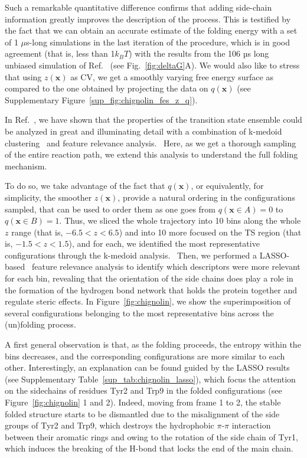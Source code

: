     Such a remarkable quantitative difference confirms that adding side-chain information greatly improves the description of the process.   
    This is testified by the fact that we can obtain an accurate estimate of the folding energy with a set of 1 $\mu$s-long simulations in the last iteration of the procedure, which is in good agreement (that is, less than 1$k_BT$) with the results from the 106 µs long unbiased simulation of Ref.~ (see Fig.~\ref{fig:deltaG}A).
    We would also like to stress that using $z(\textbf{x})$ as CV, we get a smoothly varying free energy surface as compared to the one obtained by projecting the data on $q(\textbf{x})$ (see Supplementary Figure~\ref{sup_fig:chignolin_fes_z_q}). 
    
    In Ref.~, we have shown that the properties of the transition state ensemble could be analyzed in great and illuminating detail with a combination of k-medoid clustering~\cite{Schubert2022kmedoids} and feature relevance analysis.~\cite{pizarroso2022sensitivity}
    Here, as we get a thorough sampling of the entire reaction path, we extend this analysis to understand the full folding mechanism.
    
    To do so, we take advantage of the fact that $q(\textbf{x})$, or equivalently, for simplicity, the smoother $z(\textbf{x})$, provide a natural ordering in the configurations sampled, that can be used to order them as one goes from $q(\textbf{x}\in A)=0$ to $q(\textbf{x}\in B)=1$.
    Thus, we sliced the whole trajectory into 10 bins along the whole $z$ range (that is, $-6.5<z<6.5$) and into 10 more focused on the TS region (that is, $-1.5<z<1.5$), and for each, we identified the most representative configurations through the k-medoid analysis.~\cite{Schubert2022kmedoids}
    Then, we performed a LASSO-based~\cite{novelli2022lasso} feature relevance analysis to identify which descriptors were more relevant for each bin, revealing that the orientation of the side chains does play a role in the formation of the hydrogen bond network that holds the protein together and regulate steric effects.
    In Figure~\ref{fig:chignolin}, we show the superimposition of several configurations belonging to the most representative bins across the (un)folding process.
    
    A first general observation is that, as the folding proceeds, the entropy within the bins decreases, and the corresponding configurations are more similar to each other.
    Interestingly, an explanation can be found guided by the LASSO results (see Supplementary Table~\ref{sup_tab:chignolin_lasso}), which focus the attention on the sidechains of residues Tyr2 and Trp9 in the folded configurations (see Figure~\ref{fig:chignolin} 1 and 2).
    Indeed, moving from frame 1 to 2, the stable folded structure starts to be dismantled due to the misalignment of the side groups of Tyr2 and Trp9, which destroys the hydrophobic $\pi$-$\pi$ interaction between their aromatic rings and owing to the rotation of the side chain of Tyr1, which induces the breaking of the H-bond that locks the end of the main chain.
    
